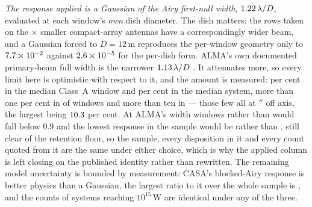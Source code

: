 \emph{The response applied is a Gaussian of the Airy first-null width},
$1.22\,\lambda/D$, evaluated at each
window's \emph{own} dish diameter. The dish matters: the \PbNAcaRow{} rows
taken on the \PbAcaRatio$\times$ smaller compact-array antennas have a
correspondingly wider beam, and a Gaussian forced to $D=12$\,m reproduces the
per-window geometry only to $7.7\times10^{-2}$ against $2.6\times10^{-5}$ for
the per-dish form. ALMA's own documented primary-beam full width is the
narrower $1.13\,\lambda/D$ \citep{ALMAHandbook}. It attenuates more, so
every limit here is optimistic with respect to it, and the amount is
measured: \RpPbWinShiftPct{} per cent in
the median Class~A window and \RpPbSysShiftPct{} per cent in the median
system, more than one per cent in \SensPbNOnePct{} of \NWindows{} windows
and more than ten in \SensPbNTenPct{} --- those few all
\SensPbWorstStar{} at \SensPbWorstOff$''$ off axis, the largest being
$10.3$ per cent. At ALMA's width \RpPbNLowAlma{} windows rather
than \RpPbNLowApplied{} would fall below $0.9$ and the lowest response in the
sample would be \SensPbAMinAlma{} rather than \SensPbAMin, still clear of the
\SensPbFloor{} retention floor, so the sample, every disposition in it and
every count quoted from it are the same under either choice, which is why the
applied column is left closing on the published identity rather than
rewritten. The remaining model uncertainty is bounded by
measurement: CASA's blocked-Airy response is better physics than a Gaussian,
the largest ratio to it over the whole sample is \PbModelMax, and the counts
of systems reaching $10^{15}$\,W are identical under any of the three.

